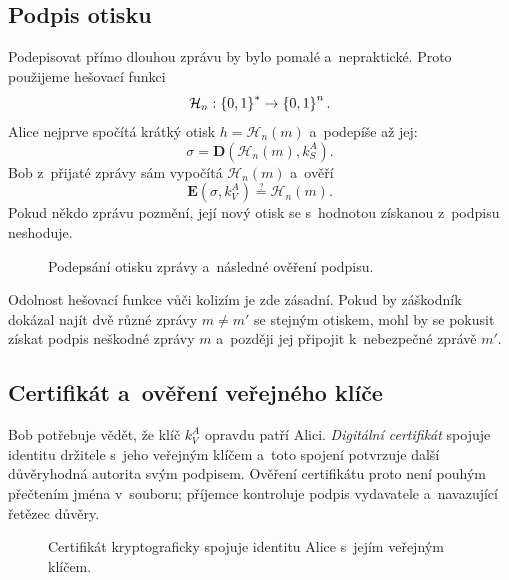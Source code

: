 
\subsection{Podpis otisku}

Podepisovat přímo dlouhou zprávu by bylo pomalé a~nepraktické. Proto použijeme hešovací funkci
\[
    \mathcal{H}_n:\left\{0,1\right\}^{*} \rightarrow \left\{0,1\right\}^{n}.
\]
Alice nejprve spočítá krátký otisk $h=\mathcal{H}_n(m)$ a~podepíše až jej:
\[
    \sigma=\mathbf{D}\left(\mathcal{H}_n(m),k_S^A\right).
\]
Bob z~přijaté zprávy sám vypočítá $\mathcal{H}_n(m)$ a~ověří
\[
    \mathbf{E}\left(\sigma,k_V^A\right)
    \stackrel{?}{=}
    \mathcal{H}_n(m).
\]
Pokud někdo zprávu pozmění, její nový otisk se s~hodnotou získanou z~podpisu neshoduje.

\begin{figure}[ht]
    \centering
    
    \caption{Podepsání otisku zprávy a~následné ověření podpisu.}
    \label{fig:krypto-podpis}
\end{figure}

Odolnost hešovací funkce vůči kolizím je zde zásadní. Pokud by záškodník dokázal najít dvě různé zprávy $m\neq m'$ se stejným otiskem, mohl by se pokusit získat podpis neškodné zprávy $m$ a~později jej připojit k~nebezpečné zprávě $m'$.

\subsection{Certifikát a~ověření veřejného klíče}

Bob potřebuje vědět, že klíč $k_V^A$ opravdu patří Alici. \emph{Digitální certifikát} spojuje identitu držitele s~jeho veřejným klíčem a~toto spojení potvrzuje další důvěryhodná autorita svým podpisem. Ověření certifikátu proto není pouhým přečtením jména v~souboru; příjemce kontroluje podpis vydavatele a~navazující řetězec důvěry.

\begin{figure}[ht]
    \centering
    
    \caption{Certifikát kryptograficky spojuje identitu Alice s~jejím veřejným klíčem.}
    \label{fig:krypto-certifikat}
\end{figure}

